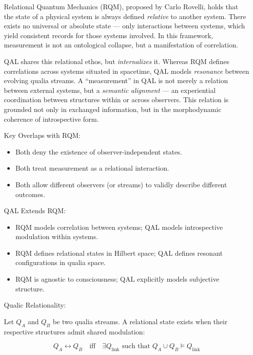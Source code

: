 \documentclass[11pt]{article}
\numberwithin{equation}{section} %
\begin{document}
Relational Quantum Mechanics (RQM), proposed by Carlo Rovelli, holds that the state of a physical system is always defined \textit{relative} to another system. There exists no universal or absolute state — only interactions between systems, which yield consistent records for those systems involved. In this framework, measurement is not an ontological collapse, but a manifestation of correlation.

QAL shares this relational ethos, but \textit{internalizes} it. Whereas RQM defines correlations across systems situated in spacetime, QAL models \textit{resonance} between evolving qualia streams. A “measurement” in QAL is not merely a relation between external systems, but a \textit{semantic alignment} — an experiential coordination between structures within or across observers. This relation is grounded not only in exchanged information, but in the morphodynamic coherence of introspective form.


\bigskip

\noindent Key Overlaps with RQM:
\begin{itemize}
  \item Both deny the existence of observer-independent states.
  \item Both treat measurement as a relational interaction.
  \item Both allow different observers (or streams) to validly describe different outcomes.
\end{itemize}

\bigskip

\noindent QAL Extends RQM:
\begin{itemize}
  \item RQM models correlation between systems; QAL models introspective modulation within systems.
  \item RQM defines relational states in Hilbert space; QAL defines resonant configurations in qualia space.
  \item RQM is agnostic to consciousness; QAL explicitly models subjective structure.
\end{itemize}

\bigskip

\noindent Qualic Relationality:

Let \( Q_A \) and \( Q_B \) be two qualia streams. A relational state exists when their respective structures admit shared modulation:

\begin{equation}
Q_A \leftrightarrow Q_B \quad \text{iff} \quad \exists Q_{\text{link}} \text{ such that } Q_A \cup Q_B \models Q_{\text{link}}
\end{equation}
\end{document}
